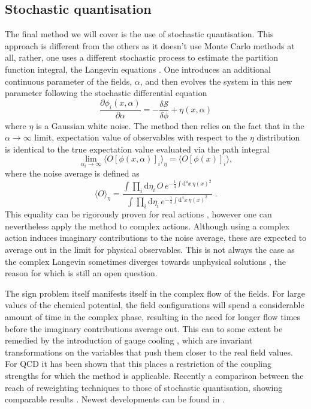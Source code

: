 \subsection{Stochastic quantisation}

The final method we will cover is the use of stochastic quantisation. This
approach is different from the others as it doesn't use Monte Carlo methods at
all, rather, one uses a different stochastic process to estimate the partition
function integral, the Langevin equations \citep{Parisi:1980ys}. One introduces
an additional continuous parameter of the fields, $\alpha$, and then evolves the
system in this new parameter following the stochastic differential equation
%
\begin{equation}
  \frac{\partial \phi_i (x, \alpha)}{\partial \alpha} = - \frac{\delta
    \mathcal{S}}{\delta \phi} + \eta(x,\alpha)
\end{equation}
%
where $\eta$ is a Gaussian white noise. The method then relies on the fact that
in the $\alpha \to \infty$ limit, expectation value of observables with respect
to the $\eta$ distribution is identical to the true expectation value evaluated
via the path integral
%
\begin{equation}
  \lim_{\alpha_i\to\infty} \big\langle O [\phi(x,\alpha)]_i \big\rangle_{\eta}
    = \big\langle O [\phi(x)]_i \big\rangle,
\end{equation}
%
where the noise average is defined as
%
\begin{equation}
  \big\langle O \big\rangle_{\eta} =
  \frac{\int \prod_i \mathrm{d} \eta_i \,O\, e^{-\frac{1}{4}\int \mathrm{d}^4
      x\, \eta(x)^2}}{\int \prod_i \mathrm{d} \eta_i \, e^{-\frac{1}{4}\int
      \mathrm{d}^4 x\, \eta(x)^2}}\;.
\end{equation}
%
This equality can be rigorously proven for real actions
\citep{Damgaard:1987rr,Huffel:2003hf}, however one can nevertheless apply the
method to complex actions. Although using a complex action induces imaginary
contributions to the noise average, these are expected to average out in the
limit for physical observables. This is not always the case as the complex
Langevin sometimes diverges towards unphysical solutions \citep{Ambjorn:1985iw},
the reason for which is still an open question.

The sign problem itself manifests itself in the complex flow of the fields. For
large values of the chemical potential, the field configurations will spend a
considerable amount of time in the complex phase, resulting in the need for
longer flow times before the imaginary contributions average out. This can to
some extent be remedied by the introduction of gauge cooling
\citep{Seiler:2012wz}, which are invariant transformations on the variables that
push them closer to the real field values. For QCD it has been shown that
this places a restriction of the coupling strengths for which the method is
applicable. Recently a comparison between the reach of reweighting techniques to
those of stochastic quantisation, showing comparable results
\citep{Fodor:2015doa}. Newest developments can be found in
\citep{Aarts:2016qrv}.


